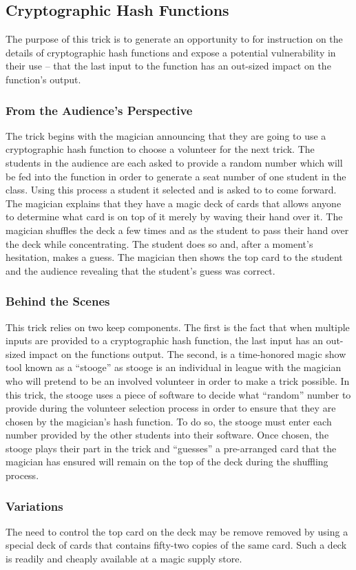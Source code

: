 \subsection{Cryptographic Hash Functions}

The purpose of this trick is to generate an opportunity to for instruction on
the details of cryptographic hash functions and expose a potential vulnerability
in their use -- that the last input to the function has an out-sized impact on
the function's output.


\subsubsection{From the Audience's Perspective}

The trick begins with the magician announcing that they are going to use a
cryptographic hash function to choose a volunteer for the next trick.  The
students in the audience are each asked to provide a random number which will be
fed into the function in order to generate a seat number of one student in the
class.  Using this process a student it selected and is asked to to come
forward.  The magician explains that they have a magic deck of cards that allows
anyone to determine what card is on top of it merely by waving their hand over
it.  The magician shuffles the deck a few times and as the student to pass their
hand over the deck while concentrating.  The student does so and, after a
moment's hesitation, makes a guess.  The magician then shows the top card to the
student and the audience revealing that the student's guess was correct.

\subsubsection{Behind the Scenes}

This trick relies on two keep components.  The first is the fact that when
multiple inputs are provided to a cryptographic hash function, the last input
has an out-sized impact on the functions output.  The second, is a time-honored
magic show tool known as a ``stooge'' as stooge is an individual in league with
the magician who will pretend to be an involved volunteer in order to make a
trick possible.  In this trick, the stooge uses a piece of software to decide
what ``random'' number to provide during the volunteer selection process in
order to ensure that they are chosen by the magician's hash function.  To do so,
the stooge must enter each number provided by the other students into their
software.  Once chosen, the stooge plays their part in the trick and ``guesses''
a pre-arranged card that the magician has ensured will remain on the top of the
deck during the shuffling process.

\subsubsection{Variations}

The need to control the top card on the deck may be remove removed by using a
special deck of cards that contains fifty-two copies of the same card.  Such a
deck is readily and cheaply available at a magic supply store.


